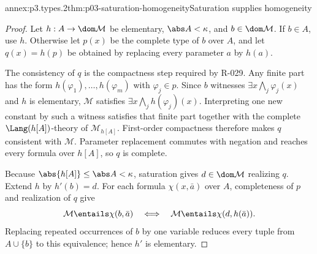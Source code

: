 \begin{annexitem}{annex:p3.types.2}{thm:p03-saturation-homogeneity}{Saturation supplies homogeneity}
\begin{proof}
Let \(h:A\to\dom\mathcal M\) be elementary, \(\abs A<\kappa\), and
\(b\in\dom\mathcal M\).  If \(b\in A\), use \(h\).  Otherwise let
\(p(x)\) be the complete type of \(b\) over \(A\), and let \(q(x)=h(p)\)
be obtained by replacing every parameter \(a\) by \(h(a)\).

The consistency of \(q\) is the compactness step required by R-029.  Any
finite part has the form \(h(\varphi_1),\ldots,h(\varphi_m)\) with
\(\varphi_j\in p\).  Since \(b\) witnesses
\(\exists x\bigwedge_j\varphi_j(x)\) and \(h\) is elementary,
\(\mathcal M\) satisfies
\(\exists x\bigwedge_jh(\varphi_j)(x)\).  Interpreting one new constant by
such a witness satisfies that finite part together with the complete
\(\Lang(h[A])\)-theory of \(\mathcal M_{h[A]}\).  First-order compactness
therefore makes \(q\)
consistent with \(\mathcal M\).  Parameter replacement commutes with
negation and reaches every formula over \(h[A]\), so \(q\) is complete.

Because \(\abs{h[A]}\leq\abs A<\kappa\), saturation gives
\(d\in\dom\mathcal M\) realizing \(q\).  Extend \(h\) by \(h'(b)=d\).
For each formula \(\chi(x,\bar a)\) over \(A\), completeness of \(p\) and
realization of \(q\) give
\[
 \mathcal M\entails\chi(b,\bar a)
 \quad\Longleftrightarrow\quad
 \mathcal M\entails\chi(d,h(\bar a)).
\]
Replacing repeated occurrences of \(b\) by one variable reduces every tuple
from \(A\cup\{b\}\) to this equivalence; hence \(h'\) is elementary.
\end{proof}
\end{annexitem}

